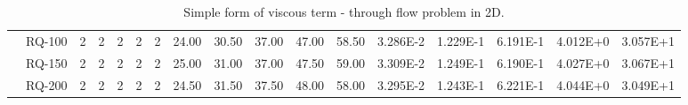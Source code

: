 \begin{table}[ht]
\begin{center}
{\begin{tabular}{cc|c|c|c|c|c|c|c|c|c|c|c|c|c|c|c|}
\multicolumn{1}{|c|}{}                      & \multicolumn{1}{|c|}{RQ-100} &	2	&	2	&	2	&	2	&	2	&	24.00	&	30.50	&	37.00	&	47.00	&	58.50	&	3.286E-2	&	1.229E-1	&	6.191E-1	&	4.012E+0	&	3.057E+1	\\
\multicolumn{1}{|c|}{}                      & \multicolumn{1}{|c|}{RQ-150} &	2	&	2	&	2	&	2	&	2	&	25.00	&	31.00	&	37.00	&	47.50	&	59.00	&	3.309E-2	&	1.249E-1	&	6.190E-1	&	4.027E+0	&	3.067E+1	\\
\multicolumn{1}{|c|}{}                      & \multicolumn{1}{|c|}{RQ-200} & 	2	&	2	&	2	&	2	&	2	&	24.50	&	31.50	&	37.50	&	48.00	&	58.00	&	3.295E-2	&	1.243E-1	&	6.221E-1	&	4.044E+0	&	3.049E+1	\\
\cline{1-17}
\end{tabular}
}
\end{center}
\caption{Simple form of viscous term - through flow problem in 2D.}
\label{table:simplethroughflow2d}
\end{table}

